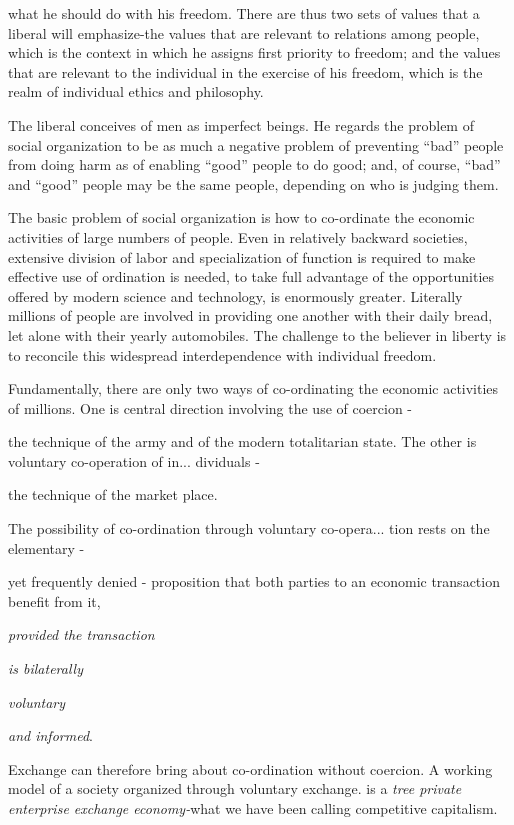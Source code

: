 \documentclass[11pt,openany]{book}
\begin{document}
what he should do with his freedom. There are thus two sets of values that a liberal will emphasize-the values that are relevant to relations among people, which is the context in which he assigns first priority to freedom; and the values that are relevant to the individual in the exercise of his freedom, which is the realm of individual ethics and philosophy.

The liberal conceives of men as imperfect beings. He regards the problem of social organization to be as much a negative problem of preventing ``bad'' people from doing harm as of enabling ``good'' people to do good; and, of course, ``bad'' and ``good'' people may be the same people, depending on who is judging them.

The basic problem of social organization is how to co-ordinate the economic activities of large numbers of people. Even in relatively backward societies, extensive division of labor and specialization of function is required to make effective use of ordination is needed, to take full advantage of the opportunities offered by modern science and technology, is enormously greater. Literally millions of people are involved in providing one another with their daily bread, let alone with their yearly automobiles. The challenge to the believer in liberty is to reconcile this widespread interdependence with individual freedom.

Fundamentally, there are only two ways of co-ordinating the economic activities of millions. One is central direction involving the use of coercion -

the technique of the army and of the modern totalitarian state. The other is voluntary co-operation of in... dividuals -

the technique of the market place.

The possibility of co-ordination through voluntary co-opera... tion rests on the elementary -

yet frequently denied - proposition that both parties to an economic transaction benefit from it,

\emph{provided the transaction}

\emph{is bilaterally}

\emph{voluntary}

\emph{and informed}.

Exchange can therefore bring about co-ordination without coercion. A working model of a society organized through voluntary exchange. is a \emph{tree private enterprise exchange economy-}what we have been calling competitive capitalism.
\end{document}
